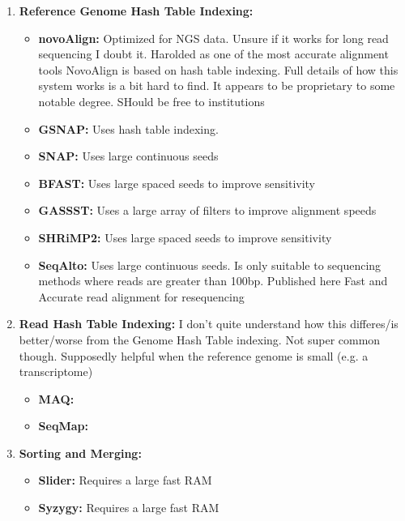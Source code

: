 \documentclass{article}
\begin{document}
\begin{enumerate}
\begin{itemize}
            \item \textbf{GEM3:} \cite{schilbertComparisonReadMapping2020}
        \end{itemize}

        \item\textbf{Reference Genome Hash Table Indexing:}
        \begin{itemize}
            \item  \textbf{novoAlign:} Optimized for NGS data.  Unsure if it works for long read sequencing I doubt it.  Harolded as one of the most accurate alignment tools NovoAlign is based on hash table indexing.  Full details of how this system works is a bit hard to find.   It appears to be proprietary to some notable degree.  SHould be free to institutions \cite{schilbertComparisonReadMapping2020}
            
            \item \textbf{GSNAP:} Uses hash table indexing. \cite{wuBenchmarkingVariantIdentification2019}
            \item \textbf{SNAP:} Uses large continuous seeds
            \item \textbf{BFAST:}   Uses large spaced seeds to improve sensitivity
            \item \textbf{GASSST:} Uses a large array of filters to improve alignment speeds
            \item \textbf{SHRiMP2:} Uses large spaced seeds to improve sensitivity
            \item \textbf{SeqAlto:} Uses large continuous seeds.  Is only suitable to sequencing methods where reads are greater than 100bp.   Published here Fast and Accurate read alignment for resequencing \cite{muFastAccurateRead2012}

        \end{itemize}


        \item\textbf{Read Hash Table Indexing:} I don't quite understand how this differes/is better/worse from the Genome Hash Table indexing.   Not super common though.  Supposedly helpful when the reference genome is small (e.g. a transcriptome) \cite{muFastAccurateRead2012}
        \begin{itemize}
            \item \textbf{MAQ:}
            \item \textbf{SeqMap:}
        \end{itemize}
        \item\textbf{Sorting and Merging:}
        \begin{itemize}
            \item \textbf{Slider:}  Requires a large fast RAM
            \item \textbf{Syzygy:} Requires a large fast RAM


\end{itemize}
\end{enumerate}
\end{document}
